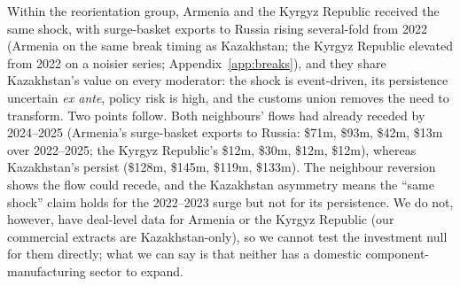 \documentclass[12pt]{article}
\begin{document}
Within the reorientation group, Armenia and the Kyrgyz Republic received the same
shock, with surge-basket exports to Russia rising several-fold from 2022 (Armenia on the same
break timing as Kazakhstan; the Kyrgyz Republic elevated from 2022 on a noisier series; Appendix~\ref{app:breaks}), and they share Kazakhstan's value on every moderator: the shock is event-driven,
its persistence uncertain \emph{ex ante}, policy risk is high, and the customs union removes
the need to transform. Two points follow. Both neighbours' flows had already
receded by 2024--2025 (Armenia's surge-basket exports to Russia: \$71m, \$93m, \$42m, \$13m
over 2022--2025; the Kyrgyz Republic's \$12m, \$30m, \$12m, \$12m), whereas Kazakhstan's
persist (\$128m, \$145m, \$119m, \$133m). The neighbour reversion shows the flow could recede,
and the Kazakhstan asymmetry means the ``same shock'' claim holds for the 2022--2023 surge
but not for its persistence. We do not, however, have deal-level data for Armenia
or the Kyrgyz Republic (our commercial extracts are Kazakhstan-only), so we cannot test the
investment null for them directly; what we can say is that neither has a domestic
component-manufacturing sector to expand.
\end{document}
